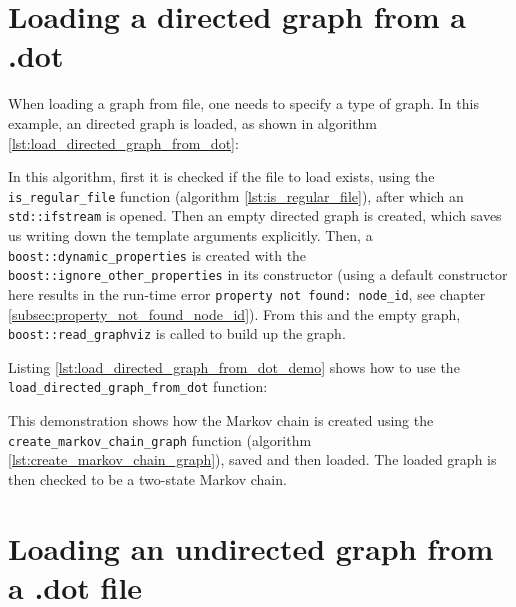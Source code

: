 \section{Loading a directed graph from a .dot}
\label{subsec:load_directed_graph_from_dot}

When loading a graph from file, one needs to specify a type of graph.
In this example, an directed graph is loaded, as shown in algorithm 
\ref{lst:load_directed_graph_from_dot}:



In this algorithm, first it is checked if the file to load exists, 
using the \verb;is_regular_file; function (algorithm \ref{lst:is_regular_file}), 
after which an \verb;std::ifstream; 
is opened.
Then an empty directed graph is created, which saves us writing down the
template arguments explicitly.
Then, a \verb;boost::dynamic_properties; 
is created with the 
\verb;boost::ignore_other_properties; 
in its constructor (using a default constructor here results in the run-time
error 
\verb;property not found: node_id;, see chapter \ref{subsec:property_not_found_node_id}).
From this and the empty graph, 
\verb;boost::read_graphviz; 
is called to build up the graph.

Listing \ref{lst:load_directed_graph_from_dot_demo}
shows how to use the \verb;load_directed_graph_from_dot; function:



This demonstration shows how the Markov chain is created using the 
\verb;create_markov_chain_graph; function (algorithm \ref{lst:create_markov_chain_graph}), 
saved and then loaded.
The loaded graph is then checked to be a two-state Markov chain.

\section{Loading an undirected graph from a .dot file}
\label{subsec:load_undirected_graph_from_dot}

